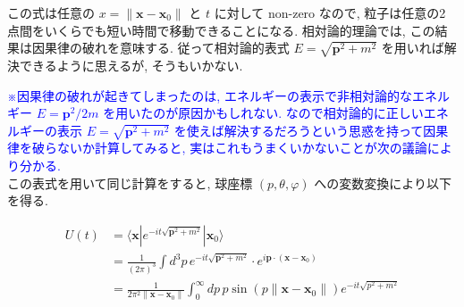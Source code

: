 \documentclass[a4paper,12pt]{article}
\begin{document}
\color{black}
この式は任意の $x = \| \boldsymbol{x} - \boldsymbol{x}_0 \|$ と $t$ に対して non-zero なので, 粒子は任意の2点間をいくらでも短い時間で移動できることになる. 相対論的理論では, この結果は因果律の破れを意味する. 従って相対論的表式 $E = \sqrt{\boldsymbol{p}^2 + m^2}$ を用いれば解決できるように思えるが, そうもいかない.\par
\textcolor{blue}{※因果律の破れが起きてしまったのは, エネルギーの表示で非相対論的なエネルギー $E = \boldsymbol{p}^2/2m$ を用いたのが原因かもしれない. なので相対論的に正しいエネルギーの表示 $E = \sqrt{\boldsymbol{p}^2 + m^2}$ を使えば解決するだろうという思惑を持って因果律を破らないか計算してみると, 実はこれもうまくいかないことが次の議論により分かる.} \\
この表式を用いて同じ計算をすると, 球座標 $(p, \theta, \varphi)$ への変数変換により以下を得る.

\begin{align*}
  U(t) &= \langle \boldsymbol{x} | e^{-it\sqrt{\boldsymbol{p}^2 + m^2}} | \boldsymbol{x}_0 \rangle \\
  &= \frac{1}{(2\pi)^3} \int d^3p \, e^{-it\sqrt{\boldsymbol{p}^2 + m^2}} \cdot e^{i\boldsymbol{p} \cdot (\boldsymbol{x} - \boldsymbol{x}_0)} \\
  &= \frac{1}{2\pi^2 \| \boldsymbol{x} - \boldsymbol{x}_0 \|} \int_0^\infty dp \, p \sin(p \| \boldsymbol{x} - \boldsymbol{x}_0 \|) e^{-it\sqrt{p^2 + m^2}}
\end{align*}
\end{document}
